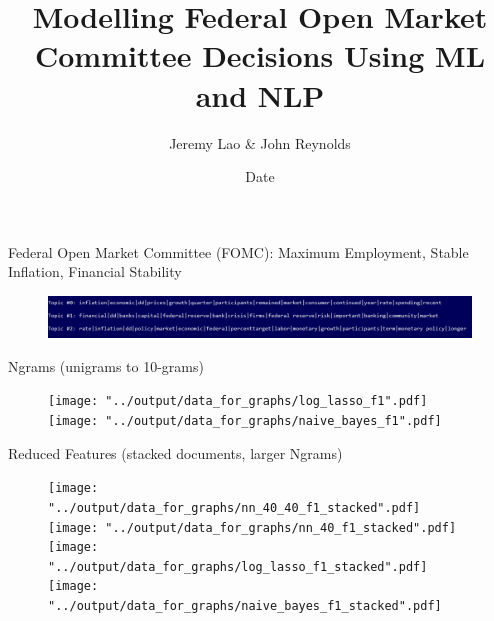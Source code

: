 \documentclass{beamer}
\title{Modelling Federal Open Market Committee Decisions Using ML and NLP}
\author{Jeremy Lao \& John Reynolds}
\institute[NYU]
{
Department of Computer Science\\
Courant Institute of Mathematical Sciences, NYU\\
  \texttt{}
}
\date{Date}
\begin{document}
\begin{frame}
\titlepage
\end{frame}



\begin{frame}
Federal Open Market Committee (FOMC): Maximum Employment, Stable Inflation, Financial Stability
\vspace{-3mm}
\begin{figure}[H]
\includegraphics[width=1\textwidth]{../output/data_for_graphs/Topic-Model-3-topics.PNG}
\end{figure}
\vspace{-5mm}

Ngrams (unigrams to 10-grams)
\vspace{-1mm}
\begin{figure}[H]
\begin{center}
\texttt{[image: "../output/data\_for\_graphs/log\_lasso\_f1".pdf]}
\texttt{[image: "../output/data\_for\_graphs/naive\_bayes\_f1".pdf]}
\end{center}
\end{figure}
\vspace{-5mm}

Reduced Features (stacked documents, larger Ngrams)
\vspace{-1mm}
\begin{figure}[H]
\texttt{[image: "../output/data\_for\_graphs/nn\_40\_40\_f1\_stacked".pdf]}
\texttt{[image: "../output/data\_for\_graphs/nn\_40\_f1\_stacked".pdf]}
\texttt{[image: "../output/data\_for\_graphs/log\_lasso\_f1\_stacked".pdf]}
\texttt{[image: "../output/data\_for\_graphs/naive\_bayes\_f1\_stacked".pdf]}
\end{figure}

\end{frame}
\end{document}
